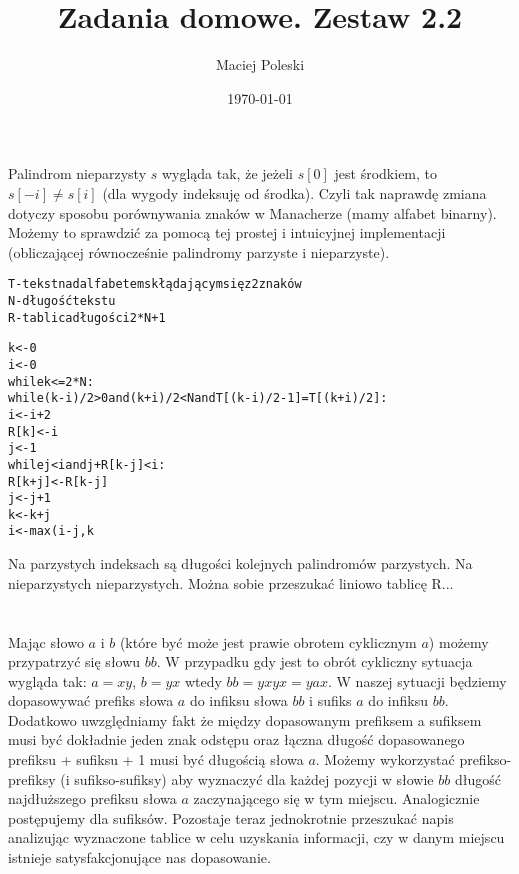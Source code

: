 \documentclass[a4paper,12pt]{article}
\title{Zadania domowe. Zestaw 2.2}
\author{Maciej Poleski}
\date{\today}
\begin{document}
\maketitle

\newpage

\section{}
\section{}
Palindrom nieparzysty $s$ wygląda tak, że jeżeli $s[0]$ jest środkiem, to $s[-i]\neq{s[i]}$ (dla wygody indeksuję od środka). Czyli tak naprawdę zmiana dotyczy sposobu porównywania znaków w Manacherze (mamy alfabet binarny). Możemy to sprawdzić za pomocą tej prostej i intuicyjnej implementacji (obliczającej równocześnie palindromy parzyste i nieparzyste).
\begin{alltt}
 T - tekst nad alfabetem skłądającym się z 2 znaków
 N - długość tekstu
 R - tablica długości 2*N+1
 
 k <- 0
 i <- 0
 while k<=2*N: 
    while (k-i)/2>0 and (k+i)/2<N and T[(k-i)/2-1]=T[(k+i)/2]:
      i <- i + 2
    R[k] <- i
    j <- 1
    while j<i and j+R[k-j]<i:
      R[k+j] <- R[k-j]
      j <- j + 1
    k <- k + j
    i <- max(i-j,k%2)
\end{alltt}
Na parzystych indeksach są długości kolejnych palindromów parzystych. Na nieparzystych nieparzystych. Można sobie przeszukać liniowo tablicę R...
\section{}
Mając słowo $a$ i $b$ (które być może jest prawie obrotem cyklicznym $a$) możemy przypatrzyć się słowu $bb$. W przypadku gdy jest to obrót cykliczny sytuacja wygląda tak: $a=xy$, $b=yx$ wtedy $bb=yxyx=yax$. W naszej sytuacji będziemy dopasowywać prefiks słowa $a$ do infiksu słowa $bb$ i sufiks $a$ do infiksu $bb$. Dodatkowo uwzględniamy fakt że między dopasowanym prefiksem a sufiksem musi być dokładnie jeden znak odstępu oraz łączna długość dopasowanego prefiksu + sufiksu + 1 musi być długością słowa $a$. Możemy wykorzystać prefikso-prefiksy (i sufikso-sufiksy) aby wyznaczyć dla każdej pozycji w słowie $bb$ długość najdłuższego prefiksu słowa $a$ zaczynającego się w tym miejscu. Analogicznie postępujemy dla sufiksów. Pozostaje teraz jednokrotnie przeszukać napis analizując wyznaczone tablice w celu uzyskania informacji, czy w danym miejscu istnieje satysfakcjonujące nas dopasowanie.
\end{document}
